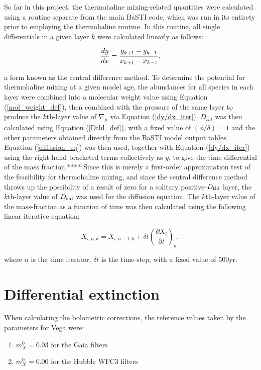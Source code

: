 \documentclass[12pt, a4paper]{report}
\begin{document}
So far in this project, the thermohaline mixing-related quantities were calculated using a routine separate from the main BaSTI code, which was run in its entirety prior to employing the thermohaline routine. In this routine, all single differentials in a given layer $k$ were calculated linearly as follows:

\begin{equation}
\frac{dy}{dx} = \frac{y_{k+1} - y_{k-1}}{x_{k+1} - x_{k-1}} \textnormal{,}
\label{dy/dx_iter}
\end{equation}

a form known as the central difference method.
To determine the potential for thermohaline mixing at a given model age, the abundances for all species in each layer were combined into a molecular weight value using Equation (\ref{mol_weight_def}), then combined with the pressure of the same layer to produce the $k$th-layer value of $\nabla_{\mu}$ via Equation (\ref{dy/dx_iter}). $D_{thl}$ was then calculated using Equation (\ref{Dthl_def}), with a fixed value of $(\phi/\delta) = 1$ and the other parameters obtained directly from the BaSTI model output tables. Equation (\ref{diffusion_eq}) was then used, together with Equation (\ref{dy/dx_iter}) using the right-hand bracketed terms collectively as $y$, to give the time differential of the mass fraction.**** Since this is merely a first-order approximation test of the feasibility for thermohaline mixing, and since the central difference method throws up the possibility of a result of zero for a solitary positive-$D_{\textnormal{thl}}$ layer, the $k$th-layer value of $D_{\textnormal{thl}}$ was used for the diffusion equation. The $k$th-layer value of the mass-fraction as a function of time was then calculated using the following linear iterative equation:

\begin{equation}
X_{i,n,k} = X_{i,n-1,k} + \delta t \left( \frac{\partial X_{i}}{\partial t}\right)_{k},
\label{iter_timeind}
\end{equation}

where $n$ is the time iterator, $\delta t$ is the time-step, with a fixed value of 500yr.

\section{Differential extinction}
When calculating the bolometric corrections, the reference values taken by the parameters for Vega were:

\begin{enumerate}
\item $m_{X}^{0} = 0.03$ for the Gaia filters
\item $m_{X}^{0} = 0.00$ for the Hubble WFC3 filters
\end{enumerate}
\end{document}
